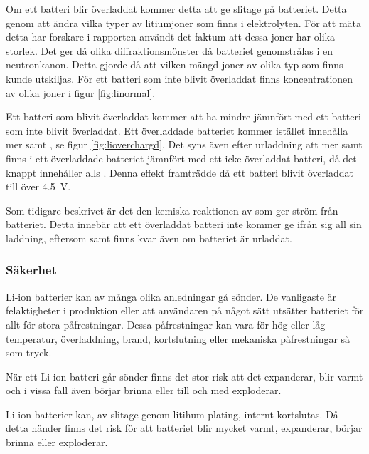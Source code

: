 \documentclass[a4paper,12pt]{article}
\begin{document}
Om ett batteri blir överladdat kommer detta att ge slitage på batteriet. Detta genom att ändra vilka typer av litiumjoner som finns i elektrolyten. För att mäta detta har forskare i rapporten \cite{overcharging-type} användt det faktum att dessa joner har olika storlek. Det ger då olika diffraktionsmönster då batteriet genomstrålas i en neutronkanon. Detta gjorde då att vilken mängd joner av olika typ som finns kunde utskiljas. För ett batteri som inte blivit överladdat finns koncentrationen av olika joner i figur \ref{fig:linormal}.


Ett batteri som blivit överladdat kommer att ha mindre  jämnfört med ett batteri som inte blivit överladdat. Ett överladdade batteriet kommer istället innehålla mer  samt  \cite{overcharging-type}, se figur \ref{fig:lioverchargd}. Det syns även efter urladdning att mer  samt  finns i ett överladdade batteriet jämnfört med ett icke överladdat batteri, då det knappt innehåller  alls \cite{overcharging-type}. Denna effekt framträdde då ett batteri blivit överladdat till över 4.5~V.


Som tidigare beskrivet är det den kemiska reaktionen av  som ger ström från batteriet. Detta innebär att ett överladdat batteri inte kommer ge ifrån sig all sin laddning, eftersom  samt  finns kvar även om batteriet är urladdat.

\subsubsection{Säkerhet}
\label{säkerhet}
Li-ion batterier kan av många olika anledningar gå sönder. De vanligaste är felaktigheter i produktion eller att användaren på något sätt utsätter batteriet för allt för stora påfrestningar. Dessa påfrestningar kan vara för hög eller låg temperatur, överladdning, brand, kortslutning eller mekaniska påfrestningar så som tryck. \cite{lihazard}

När ett Li-ion batteri går sönder finns det stor risk att det expanderar, blir varmt och i vissa fall även börjar brinna eller till och med exploderar.

Li-ion batterier kan, av slitage genom litihum plating, internt kortslutas.\cite{nasa} Då detta händer finns det risk för att batteriet blir mycket varmt, expanderar, börjar brinna eller exploderar.
\end{document}

